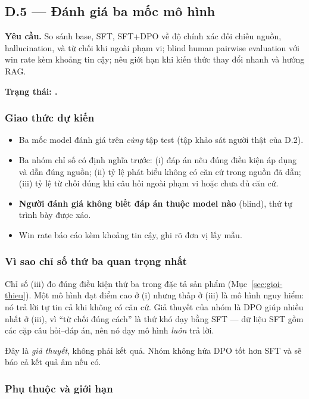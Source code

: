 \subsection{D.5 --- Đánh giá ba mốc mô hình}
\label{sec:d5}

\textbf{Yêu cầu.} So sánh base, SFT, SFT+DPO về độ chính xác đối chiếu nguồn,
hallucination, và từ chối khi ngoài phạm vi; blind human pairwise evaluation với
win rate kèm khoảng tin cậy; nêu giới hạn khi kiến thức thay đổi nhanh và hướng
RAG.

\textbf{Trạng thái: \chualam.}

\subsubsection{Giao thức dự kiến}

\begin{itemize}[leftmargin=2em]
\item Ba mốc model đánh giá trên \emph{cùng} tập test (tập khảo sát người thật của
D.2).
\item Ba nhóm chỉ số có định nghĩa trước: (i) đáp án nêu đúng điều kiện áp dụng và
dẫn đúng nguồn; (ii) tỷ lệ phát biểu không có căn cứ trong nguồn đã dẫn;
(iii) tỷ lệ từ chối đúng khi câu hỏi ngoài phạm vi hoặc chưa đủ căn cứ.
\item \textbf{Người đánh giá không biết đáp án thuộc model nào} (blind), thứ tự
trình bày được xáo.
\item Win rate báo cáo kèm khoảng tin cậy, ghi rõ đơn vị lấy mẫu.
\end{itemize}

\subsubsection{Vì sao chỉ số thứ ba quan trọng nhất}

Chỉ số (iii) đo đúng điều kiện thứ ba trong đặc tả sản phẩm
(Mục~\ref{sec:gioi-thieu}). Một mô hình đạt điểm cao ở (i) nhưng thấp ở (iii) là mô
hình nguy hiểm: nó trả lời tự tin cả khi không có căn cứ. Giả thuyết của nhóm là
DPO giúp nhiều nhất ở (iii), vì ``từ chối đúng cách'' là thứ khó dạy bằng SFT ---
dữ liệu SFT gồm các cặp câu hỏi--đáp án, nên nó dạy mô hình \emph{luôn} trả lời.

Đây là \emph{giả thuyết}, không phải kết quả. Nhóm không hứa DPO tốt hơn SFT và sẽ
báo cả kết quả âm nếu có.

\subsubsection{Phụ thuộc và giới hạn}

